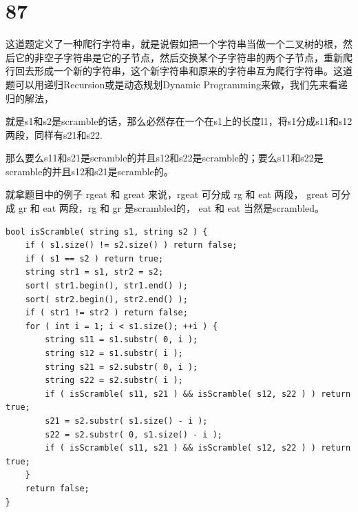 \documentclass[12pt,a4paper]{article}
\begin{document}
\section{87}
\begin{CJK}{UTF8}{gbsn}
这道题定义了一种爬行字符串，就是说假如把一个字符串当做一个二叉树的根，然后它的非空子字符串是它的子节点，然后交换某个子字符串的两个子节点，重新爬行回去形成一个新的字符串，这个新字符串和原来的字符串互为爬行字符串。这道题可以用递归Recursion或是动态规划Dynamic Programming来做，我们先来看递归的解法，
\par
就是s1和s2是scramble的话，那么必然存在一个在s1上的长度l1，将s1分成s11和s12两段，同样有s21和s22.
\par
那么要么s11和s21是scramble的并且s12和s22是scramble的；要么s11和s22是scramble的并且s12和s21是scramble的。
\par
就拿题目中的例子 rgeat 和 great 来说，rgeat 可分成 rg 和 eat 两段， great 可分成 gr 和 eat 两段，rg 和 gr 是scrambled的， eat 和 eat 当然是scrambled。
\end{CJK}
\begin{lstlisting}
bool isScramble( string s1, string s2 ) {
	if ( s1.size() != s2.size() ) return false;
	if ( s1 == s2 ) return true;
	string str1 = s1, str2 = s2;
	sort( str1.begin(), str1.end() );
	sort( str2.begin(), str2.end() );
	if ( str1 != str2 ) return false;
	for ( int i = 1; i < s1.size(); ++i ) {
		string s11 = s1.substr( 0, i );
		string s12 = s1.substr( i );
		string s21 = s2.substr( 0, i );
		string s22 = s2.substr( i );
		if ( isScramble( s11, s21 ) && isScramble( s12, s22 ) ) return true;
		s21 = s2.substr( s1.size() - i );
		s22 = s2.substr( 0, s1.size() - i );
		if ( isScramble( s11, s21 ) && isScramble( s12, s22 ) ) return true;
	}
	return false;
}
\end{lstlisting}
\end{document}
